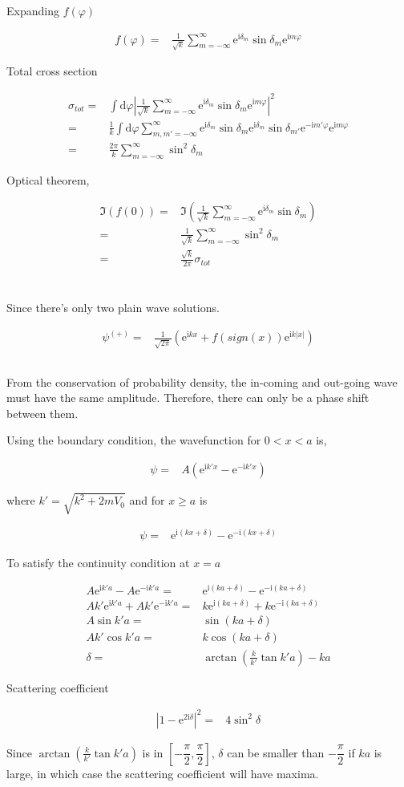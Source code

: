 \documentclass[10pt,fleqn]{article}
\newcommand{\ud}{\mathrm{d}}
\newcommand{\ue}{\mathrm{e}}
\newcommand{\ui}{\mathrm{i}}
\newcommand{\eqar}[1]
{
  \begin{align*}
    #1
  \end{align*}
}
\newcommand{\paren}[1]{{\left({#1}\right)}}
\newcommand{\abs}[1]{{\left|{#1}\right|}}
\newcommand{\sqr}[1]{{\left[{#1}\right]}}
\begin{document}
Expanding $f(\varphi)$
\eqar{
  f(\varphi)=&\frac{1}{\sqrt{k}}\sum_{m=-\infty}^{\infty}\ue^{\ui\delta_m}\sin\delta_m\ue^{\ui m\varphi}
}

Total cross section
\eqar{
  \sigma_{tot}=&\int\ud\varphi\abs{\frac{1}{\sqrt{k}}\sum_{m=-\infty}^{\infty}\ue^{\ui\delta_m}\sin\delta_m\ue^{\ui m\varphi}}^2\\
  =&\frac{1}{k}\int\ud\varphi\sum_{m,m'=-\infty}^{\infty}\ue^{\ui\delta_m}\sin\delta_m\ue^{\ui\delta_m}\sin\delta_{m'}\ue^{-\ui m'\varphi}\ue^{\ui m\varphi}\\
  =&\frac{2\pi}{k}\sum_{m=-\infty}^{\infty}\sin^2\delta_m
}
Optical theorem,
\eqar{
  \Im\paren{f(0)}=&\Im\paren{\frac{1}{\sqrt{k}}\sum_{m=-\infty}^{\infty}\ue^{\ui\delta_m}\sin\delta_m}\\
  =&\frac{1}{\sqrt{k}}\sum_{m=-\infty}^{\infty}\sin^2\delta_m\\
  =&\frac{\sqrt{k}}{2\pi}\sigma_{tot}
}

\section{}
\section{}
\subsection{}
Since there's only two plain wave solutions.
\eqar{
  \psi^{(+)}=&\frac{1}{\sqrt{2\pi}}\paren{\ue^{\ui kx}+f(sign(x))\ue^{\ui k\abs{x}}}
}

\subsection{}
From the conservation of probability density,
the in-coming and out-going wave must have the same amplitude.
Therefore, there can only be a phase shift between them.

Using the boundary condition, the wavefunction for $0 < x < a$ is,
\eqar{
  \psi=&A\paren{\ue^{\ui k'x}-\ue^{-\ui k'x}}
}
where $k'=\sqrt{k^2+2mV_0}$ and for $x \geqslant a$ is
\eqar{
  \psi=&\ue^{\ui\paren{kx+\delta}}-\ue^{-\ui\paren{kx+\delta}}
}
To satisfy the continuity condition at $x=a$
\eqar{
  A\ue^{\ui k'a}-A\ue^{-\ui k'a}=&\ue^{\ui\paren{ka+\delta}}-\ue^{-\ui\paren{ka+\delta}}\\
  Ak'\ue^{\ui k'a}+Ak'\ue^{-\ui k'a}=&k\ue^{\ui\paren{ka+\delta}}+k\ue^{-\ui\paren{ka+\delta}}\\
  A\sin k'a=&\sin\paren{ka+\delta}\\
  Ak'\cos k'a=&k\cos\paren{ka+\delta}\\
  \delta=&\arctan\paren{\frac{k}{k'}\tan k'a}-ka
}
Scattering coefficient
\eqar{
  \abs{1-\ue^{2\ui\delta}}^2=&4\sin^2\delta
}
Since $\arctan\paren{\frac{k}{k'}\tan k'a}$ is in $\sqr{-\dfrac\pi2, \dfrac\pi2}$,
$\delta$ can be smaller than $-\dfrac\pi2$ if $ka$ is large, in which case the
scattering coefficient will have maxima.
\end{document}
